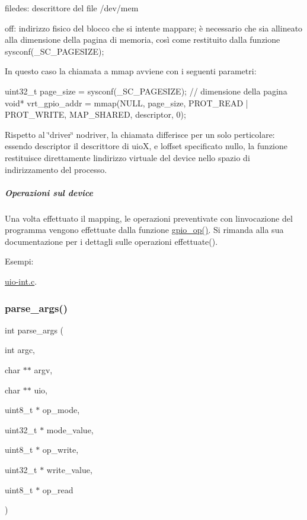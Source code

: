 \begin{DoxyItemize}
\item filedes\+: descrittore del file /dev/mem
\item off\+: indirizzo fisico del blocco che si intente mappare; è necessario che sia allineato alla dimensione della pagina di memoria, così come restituito dalla funzione sysconf(\+\_\+\+S\+C\+\_\+\+P\+A\+G\+E\+S\+I\+Z\+E);
\end{DoxyItemize}

In questo caso la chiamata a mmap avviene con i seguenti parametri\+: 
\begin{DoxyCode}
uint32\_t page\_size = sysconf(\_SC\_PAGESIZE);     \textcolor{comment}{// dimensione della pagina}
\textcolor{keywordtype}{void}* vrt\_gpio\_addr = mmap(NULL, page\_size, PROT\_READ | PROT\_WRITE, MAP\_SHARED, descriptor, 0);
\end{DoxyCode}


Rispetto al \char`\"{}driver\char`\"{} nodriver, la chiamata differisce per un solo perticolare\+: essendo descriptor il descrittore di uioX, e l\textquotesingle{}offset specificato nullo, la funzione restituisce direttamente l\textquotesingle{}indirizzo virtuale del device nello spazio di indirizzamento del processo.

\subparagraph*{Operazioni sul device}

Una volta effettuato il mapping, le operazioni preventivate con l\textquotesingle{}invocazione del programma vengono effettuate dalla funzione \hyperlink{uio-int_8c_a78b676750c5d08c316cad35ec3963c53}{gpio\+\_\+op()}. Si rimanda alla sua documentazione per i dettagli sulle operazioni effettuate().\begin{Desc}
\item[Esempi\+: ]\par
\hyperlink{uio-int_8c-example}{uio-\/int.\+c}.\end{Desc}
\mbox{\label{uio-int_8c_ab6b18eb1bf7bc996599c06dc6dad8f53}} 
\subsubsection{\texorpdfstring{parse\+\_\+args()}{parse\_args()}}
{\footnotesize\ttfamily int parse\+\_\+args (\begin{DoxyParamCaption}\item[{int}]{argc,  }\item[{char $\ast$$\ast$}]{argv,  }\item[{char $\ast$$\ast$}]{uio,  }\item[{uint8\+\_\+t $\ast$}]{op\+\_\+mode,  }\item[{uint32\+\_\+t $\ast$}]{mode\+\_\+value,  }\item[{uint8\+\_\+t $\ast$}]{op\+\_\+write,  }\item[{uint32\+\_\+t $\ast$}]{write\+\_\+value,  }\item[{uint8\+\_\+t $\ast$}]{op\+\_\+read }\end{DoxyParamCaption})}



